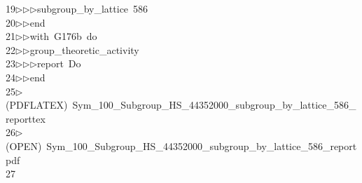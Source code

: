 \begin{tabbing}
19\>$\triangleright$\>$\triangleright$\>$\triangleright$\>subgroup\_by\_lattice\ 586\ \\[0pt]
20\>$\triangleright$\>$\triangleright$\>end\ \\[0pt]
21\>$\triangleright$\>$\triangleright$\>with\ G176b\ do\ \\[0pt]
22\>$\triangleright$\>$\triangleright$\>group\_theoretic\_activity\ \\[0pt]
23\>$\triangleright$\>$\triangleright$\>$\triangleright$\>report\ Do\ \\[0pt]
24\>$\triangleright$\>$\triangleright$\>end\\[0pt]
25\>$\triangleright$\>(PDFLATEX)\ Sym\_100\_Subgroup\_HS\_44352000\_subgroup\_by\_lattice\_586\_reporttex\\[0pt]
26\>$\triangleright$\>(OPEN)\ Sym\_100\_Subgroup\_HS\_44352000\_subgroup\_by\_lattice\_586\_reportpdf\\[0pt]
27\>\end{tabbing}
